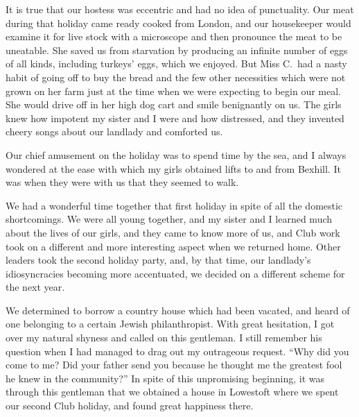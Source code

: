 It is true that our hostess was eccentric and had no
idea of punctuality. Our meat during that holiday came
ready cooked from London, and our housekeeper would
examine it for live stock with a microscope and then
pronounce the meat to be uneatable. She saved us
from starvation by producing an infinite number of eggs
of  all kinds, including turkeys’ eggs, which we enjoyed.
But Miss C.\ had a nasty habit of going off to buy the
bread and the few other necessities which were not grown
on her farm just at the time when we were expecting to
begin our meal. She would drive off in her high dog
cart and smile benignantly on us. The girls knew how
impotent my sister and I were and how distressed, and
they invented cheery songs about our landlady and
comforted us.

Our chief amusement on the holiday was to spend
time by the sea, and I always wondered at the ease with
which my girls obtained lifts to and from Bexhill. It
was when they were with us that they seemed to
walk.

We had a wonderful time together that first holiday
in spite of all the domestic shortcomings. We were all
young together, and my sister and I learned much about
the lives of our girls, and they came to know more of us,
and Club work took on a different and more interesting
aspect when we returned home. Other leaders took the
second holiday party, and, by that time, our landlady’s
idiosyncracies becoming more accentuated, we decided on
a different scheme for the next year.

We determined to borrow a country house which had
been vacated, and heard of one belonging to a certain
Jewish philanthropist. With great hesitation, I got over
my natural shyness and called on this gentleman. I still
remember his question when I had managed to drag out
my outrageous request. “Why did you come to me? Did
your father send you because he thought me the greatest
fool he knew in the community?” In spite of this unpromising
beginning, it was through this gentleman that
we obtained a house in Lowestoft where we spent our
second Club holiday, and found great happiness there.

